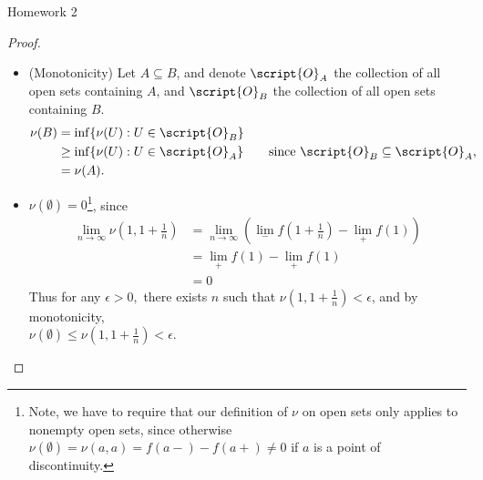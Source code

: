 \documentclass[12pt,letterpaper]{article}
\begin{document}
\pagestyle{fancy}
\begin{center}
{\Large Homework 2}%
\end{center}

\begin{proof}\mbox{}
\begin{itemize}
\item (Monotonicity) Let $A \subseteq B$, and denote $\script{O}_A$ the collection of all open sets containing $A$, and $\script{O}_B$ the collection of all open sets containing $B$.
\begin{align*}
\nu(B) &= \inf\{\nu(U) : U\in\script{O}_B\} \\
&\geq \inf\{\nu(U) : U\in\script{O}_A\} \quad\quad \text{since }\script{O}_B\subseteq \script{O}_A,\\
&=\nu(A).
\end{align*}

\item $\nu(\emptyset)=0$\footnote{Note, we have to require that our definition of $\nu$ on open sets only applies to nonempty open sets, since otherwise $\nu(\emptyset)=\nu(a,a)=f(a-)-f(a+)\neq0$ if $a$ is a point of discontinuity.}, since 
	\begin{align*}
	\lim_{n\to\infty}\nu\left (1,1+\tfrac{1}{n}\right ) &= \lim_{n\to\infty}\left (\lim_-f\left (1+\frac{1}{n}\right )-\lim_+f(1)\right ) \\
	&= \lim_+f(1)-\lim_+f(1) \\
	&=0
	\end{align*}
Thus for any $\epsilon>0,$ there exists $n$ such that $\nu\left (1,1+\tfrac{1}{n}\right )<\epsilon$, and by monotonicity, \\
$\nu(\emptyset)\leq\nu\left (1,1+\tfrac{1}{n}\right )<\epsilon$.


\end{itemize}
\end{proof}
\end{document}

